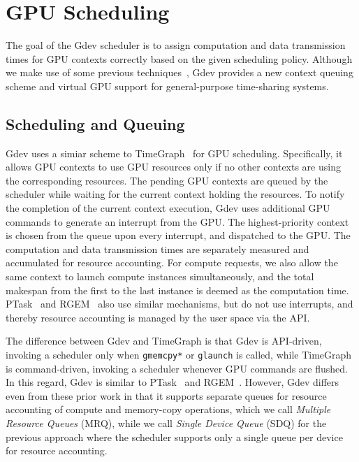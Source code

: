 \section{GPU Scheduling}
\label{sec:scheduling}

The goal of the Gdev scheduler is to assign computation and data
transmission times for GPU contexts correctly based on the given
scheduling policy.
Although we make use of some previous
techniques~\cite{Kato_RTSS11,Kato_ATC11}, Gdev provides a new context
queuing scheme and virtual GPU support for general-purpose time-sharing
systems.

\subsection{Scheduling and Queuing}
\label{sec:scheduling_queueing}

Gdev uses a simiar scheme to TimeGraph~\cite{Kato_ATC11} for GPU
scheduling.
Specifically, it allows GPU contexts to use GPU resources only if no
other contexts are using the corresponding resources.
The pending GPU contexts are queued by the scheduler while waiting for
the current context holding the resources.
To notify the completion of the current context execution, Gdev
uses additional GPU commands to generate an interrupt from the GPU.
The highest-priority context is chosen from the queue upon every
interrupt, and dispatched to the GPU.
The computation and data transmission times are separately measured and
accumulated for resource accounting.
For compute requests, we also allow the same context to launch compute
instances simultaneously, and the total makespan from the first to the last
instance is deemed as the computation time.
PTask~\cite{Rossbach_SOSP11} and RGEM~\cite{Kato_RTSS11} also use
similar mechanisms, but do not use interrupts, and thereby resource
accounting is managed by the user space via the API.

The difference between Gdev and TimeGraph is that Gdev is API-driven,
invoking a scheduler only when \texttt{gmemcpy*} or \texttt{glaunch} is
called, while TimeGraph is command-driven, invoking a scheduler whenever
GPU commands are flushed.
In this regard, Gdev is similar to PTask~\cite{Rossbach_SOSP11} and
RGEM~\cite{Kato_RTSS11}.
However, Gdev differs even from these prior work in that it supports
separate queues for resource accounting of compute and memory-copy
operations, which we call \textit{Multiple Resource Queues} (MRQ), while
we call \textit{Single Device Queue} (SDQ) for the previous approach
where the scheduler supports only a single queue per device for resource
accounting.

